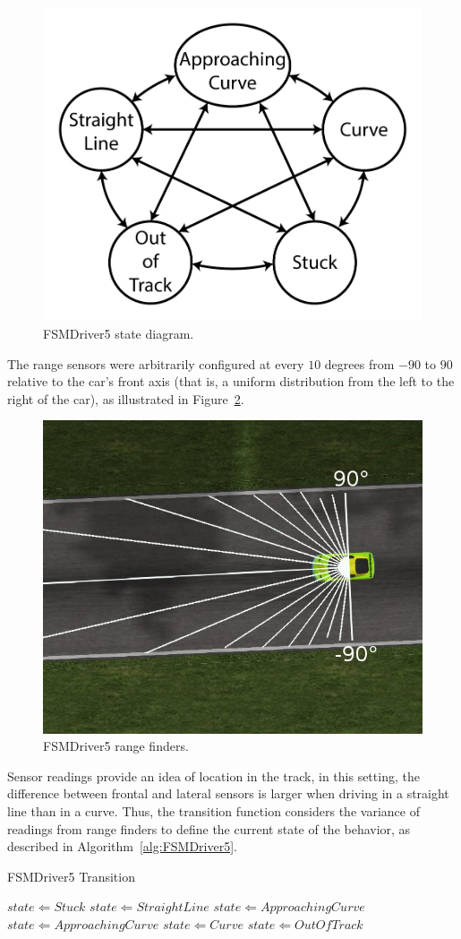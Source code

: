 \begin{figure}[h]
	\centering
	\includegraphics[width=.45\textwidth]{img/FiveStateFSM}
	\caption{FSMDriver5 state diagram.}
	\label{Fig:FSM5Diagram}
\end{figure}

The range sensors were arbitrarily configured at every $10$ degrees from $-90$ to $90$ relative to the car's front axis (that is, a uniform distribution from the left to the right of the car), as illustrated in Figure~\ref{Fig:FSM5Sensors}.

\begin{figure}[h]
	\centering
	\includegraphics[width=.45\textwidth]{img/FSM5Sensors}
	\caption{FSMDriver5 range finders.}
	\label{Fig:FSM5Sensors}
\end{figure}

Sensor readings provide an idea of location in the track, in this setting, the difference between frontal and lateral sensors is larger when driving in a straight line than in a curve. Thus, the transition function considers the variance of readings from range finders to define the current state of the  behavior, as described in Algorithm~\ref{alg:FSMDriver5}.

\begin{algorithm}[h]%
\caption{FSMDriver5 Transition}%
\label{alg:FSMDriver5}%
\begin{algorithmic}
        \STATE $state \Leftarrow Stuck$
    \ELSE
			\STATE $state \Leftarrow StraightLine$
			\STATE $state \Leftarrow ApproachingCurve$
			\STATE $state \Leftarrow ApproachingCurve$
			\STATE $state \Leftarrow Curve$
		\ELSE
			\STATE $state \Leftarrow Out Of Track$
		\ENDIF
	\ENDIF
\end{algorithmic}
\end{algorithm}

